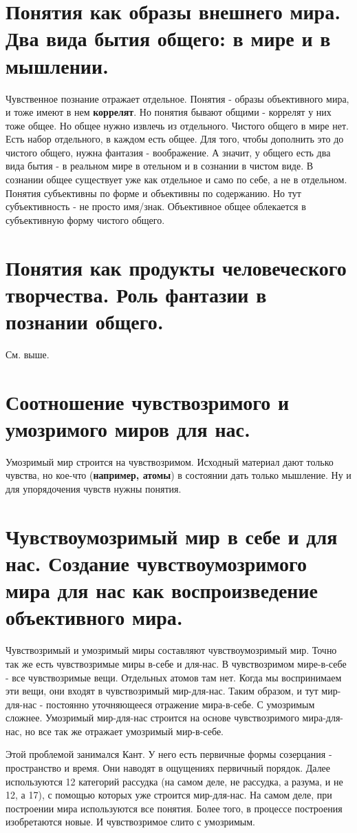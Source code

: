\section{ Понятия как образы внешнего мира. Два вида бытия общего: в мире и в мышлении.}
Чувственное познание отражает отдельное. Понятия - образы объективного мира, и тоже имеют в нем \textbf{коррелят}. Но понятия бывают общими - коррелят у них тоже общее. Но общее нужно извлечь из отдельного. Чистого общего в мире нет. Есть набор отдельного, в каждом есть общее. Для того, чтобы дополнить это до чистого общего, нужна фантазия - воображение. А значит, у общего есть два вида бытия  - в реальном мире в отельном и в сознании в чистом виде. В сознании общее существует уже как отдельное и само по себе, а не в отдельном. Понятия субъективны по форме и объективны по содержанию. Но тут субъективность - не просто имя/знак. Объективное общее облекается в субъективную форму чистого общего. 

\section{ Понятия как продукты человеческого творчества. Роль фантазии в познании общего.}
См. выше.

\section{ Соотношение чувствозримого и умозримого миров для нас.}
Умозримый мир строится на чувствозримом. Исходный материал дают только чувства, но кое-что (\textbf{например, атомы}) в состоянии дать только мышление. Ну и для упорядочения чувств нужны понятия.

\section{ Чувствоумозримый мир в себе и для нас. Создание чувствоумозримого мира для нас как воспроизведение объективного мира.}
Чувствозримый и умозримый миры составляют чувствоумозримый мир. Точно так же есть чувствозримые миры в-себе и для-нас. В чувствозримом мире-в-себе - все чувствозримые вещи. Отдельных атомов там нет. Когда мы воспринимаем эти вещи, они входят в чувствозримый мир-для-нас. Таким образом, и тут мир-для-нас - постоянно уточняющееся отражение мира-в-себе. С умозримым сложнее. Умозримый мир-для-нас строится на основе чувствозримого мира-для-нас, но все так же отражает умозримый мир-в-себе.

Этой проблемой занимался Кант. У него есть первичные формы созерцания - пространство и время. Они наводят в ощущениях первичный порядок. Далее используются 12 категорий рассудка (на самом деле, не рассудка, а разума, и не 12, а 17), с помощью которых уже строится мир-для-нас. На самом деле, при построении мира используются все понятия. Более того, в процессе построения изобретаются новые. И чувствозримое слито с умозримым.

